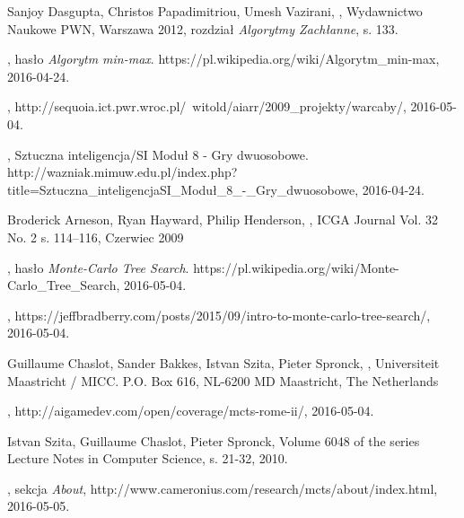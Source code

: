 \documentclass[11pt]{aghdpl}
\begin{document}
\begin{thebibliography}{1}
\bibitem{}
\label{bib:algorytmy_zachlanny}
Sanjoy Dasgupta, Christos Papadimitriou, Umesh Vazirani,
,
\newblock Wydawnictwo Naukowe PWN, Warszawa 2012,
\newblock rozdział {\em Algorytmy Zachłanne}, s. 133.

\bibitem{}
\label{bib:wiki_minMax}
, hasło {\em Algorytm min-max}.
\newblock https://pl.wikipedia.org/wiki/Algorytm\_min-max, 2016-04-24.


\bibitem{}
\label{bib:minMax_warcaby}
,
\newblock http://sequoia.ict.pwr.wroc.pl/~witold/aiarr/2009\_projekty/warcaby/, 2016-05-04.

\bibitem{}
\label{bib:wazniak_minMax}
, Sztuczna inteligencja/SI Moduł 8 - Gry dwuosobowe.
\newblock http://wazniak.mimuw.edu.pl/index.php?title=Sztuczna\_inteligencja\/SI\_Moduł\_8\_-\_Gry\_dwuosobowe, 2016-04-24.

\bibitem{}
\label{bib:mcts_hex}
Broderick Arneson, Ryan Hayward, Philip Henderson,
,
\newblock ICGA Journal Vol. 32 No. 2 s. 114–116, Czerwiec 2009

\bibitem{}
\label{bib:wiki_mcts}
, hasło {\em Monte-Carlo Tree Search}.
\newblock https://pl.wikipedia.org/wiki/Monte-Carlo\_Tree\_Search, 2016-05-04.

\bibitem{}
\label{bib:mcts_wprowadzenie}
,
\newblock https://jeffbradberry.com/posts/2015/09/intro-to-monte-carlo-tree-search/, 2016-05-04.

\bibitem{}
\label{bib:mcts_opis}
Guillaume Chaslot, Sander Bakkes, Istvan Szita, Pieter Spronck,
,
\newblock Universiteit Maastricht / MICC.
\newblock P.O. Box 616, NL-6200 MD Maastricht, The Netherlands

\bibitem{}
\label{bib:mcts_totalWar}
,
\newblock http://aigamedev.com/open/coverage/mcts-rome-ii/, 2016-05-04.

\bibitem{}
\label{bib:mcts_osadnicy}
Istvan Szita, Guillaume Chaslot, Pieter Spronck,
\newblock Volume 6048 of the series Lecture Notes in Computer Science, s. 21-32, 2010.

\bibitem{}
\label{bib:mcts_uct}
, sekcja {\em About},
\newblock http://www.cameronius.com/research/mcts/about/index.html, 2016-05-05.


\end{thebibliography}
\end{document}
